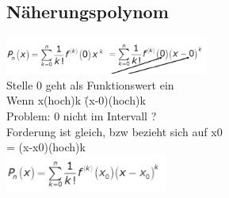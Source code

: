 \documentclass[12pt,a4paper]{article}
\begin{document}
\subsection{Näherungspolynom}
\includegraphics[width=0.5\textwidth]{BIlder/V1/6.png}\\
Stelle 0 geht als Funktionswert ein\\
Wenn x(hoch)k \= (x-0)(hoch)k\\
Problem: 0 nicht im Intervall ?\\
Forderung ist gleich, bzw bezieht sich auf x0\\
= (x-x0)(hoch)k\\
\includegraphics[width=0.4\textwidth]{BIlder/V1/7.png}
\end{document}
